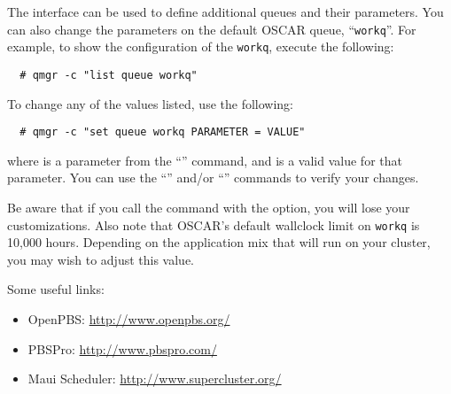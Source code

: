 The  interface can be used to define additional queues and
their parameters.  You can also change the parameters on the default
OSCAR queue, ``{\tt workq}''.  For example, to show the configuration
of the {\tt workq}, execute the following:

\begin{verbatim}
  # qmgr -c "list queue workq"
\end{verbatim}

To change any of the values listed, use the following:

\begin{verbatim}
  # qmgr -c "set queue workq PARAMETER = VALUE"
\end{verbatim}

where  is a parameter from the ``''
command, and  is a valid value for that parameter.  You can
use the ``'' and/or ``'' commands to
verify your changes.

Be aware that if you call the  command with the
 option, you will lose your customizations.  Also note
that OSCAR's default wallclock limit on {\tt workq} is 10,000 hours.
Depending on the application mix that will run on your cluster, you
may wish to adjust this value.

Some useful links:

\begin{itemize}
\item OpenPBS: \url{http://www.openpbs.org/}

\item PBSPro: \url{http://www.pbspro.com/}

\item Maui Scheduler: \url{http://www.supercluster.org/}
\end{itemize}

